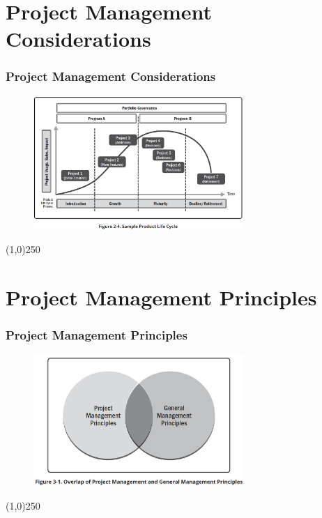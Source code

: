 \section{Project Management Considerations}


\begin{frame}
\frametitle{Project Management Considerations}
 \begin{figure}
    \centering
        \includegraphics[width = 8cm]{../images/standard/Fig2-4.jpg}
    \label{standardfig:2-4}
 \end{figure}
\end{frame}
\begin{center}\line(1,0){250}\end{center}



\section{Project Management Principles}



\begin{frame}
\frametitle{Project Management Principles}
 \begin{figure}
    \centering
        \includegraphics[width = 8cm]{../images/standard/Fig3-1.jpg}
    \label{standardfig:3-1}
 \end{figure}
\end{frame}
\begin{center}\line(1,0){250}\end{center}




